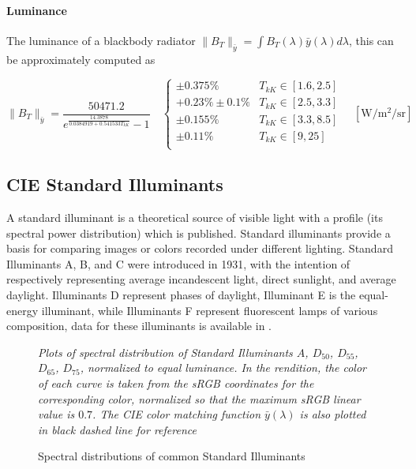 \paragraph{Luminance}

The luminance of a blackbody radiator $\|B_T\|_{\bar y} = \int B_T(\lambda)\bar y(\lambda) d\lambda$,
this can be approximately computed as

\begin{equation}
\|B_T\|_{\bar y} = \frac{\num{50471.2}}{e^{\frac{14.3878}{\num{0.0384919} +
\num{0.541533} T_{kK}}}-1}
\quad \left\{\begin{array}{cl}
\pm 0.375\% & T_{kK} \in [1.6, 2.5] \\
+0.23\% \pm 0.1\% & T_{kK} \in [2.5, 3.3] \\
\pm 0.155\% & T_{kK} \in [3.3, 8.5] \\
\pm 0.11\%  & T_{kK} \in [9, 25] \\
\end{array}\right.
\quad \left[\unit{\watt\per\square\meter\per\steradian}\right]
\end{equation}

\subsection{CIE Standard Illuminants}

A standard illuminant is a theoretical source of visible light with a profile
(its spectral
power distribution) which is published. Standard illuminants provide a basis for
comparing
images or colors recorded under different lighting. Standard Illuminants A, B,
and C were
introduced in 1931, with the intention of respectively representing average
incandescent light,
direct sunlight, and average daylight. Illuminants D represent phases of
daylight, Illuminant E
is the equal-energy illuminant, while Illuminants F represent fluorescent lamps
of various
composition, data for these illuminants is available in \cite{stdilluminants}.

\begin{figure}
{
\small
\centering

\caption{Spectral distributions of common Standard Illuminants}
\label{fig:illumspectra}
}
\vskip 1mm
{\footnotesize\it Plots of spectral distribution of
Standard Illuminants $A$, $D_{50}$, $D_{55}$, $D_{65}$, $D_{75}$,
normalized to equal luminance.
In the rendition, the color of each curve is taken from the
sRGB coordinates for the corresponding color,
normalized so that the maximum sRGB linear value is $0.7$.
The CIE color matching function $\bar y (\lambda)$ is also plotted in
black dashed line for reference}
\end{figure}


